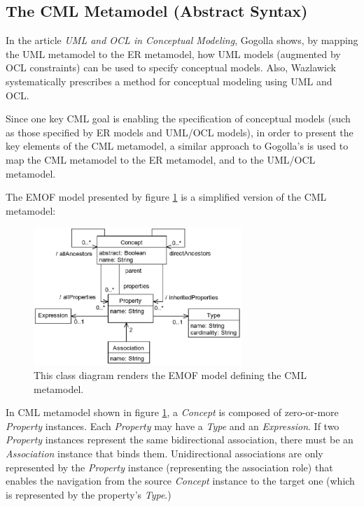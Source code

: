 \subsection{The CML Metamodel (Abstract Syntax)}\label{subsec:metamodel}

In the article \emph{UML and OCL in Conceptual Modeling},
Gogolla \cite{gogolla} shows, by mapping the UML \cite{uml} metamodel to the ER \cite{er} metamodel,
how UML models (augmented by OCL \cite{ocl} constraints) can be used to specify conceptual models.
Also, Wazlawick \cite{wazlawick} systematically prescribes a method for conceptual modeling using UML and OCL.

Since one key CML goal is enabling the specification of conceptual models
(such as those specified by ER models and UML/OCL models),
in order to present the key elements of the CML metamodel,
a similar approach to Gogolla's is used to map the CML metamodel to the ER metamodel,
and to the UML/OCL metamodel.

The EMOF \cite{mof} model presented by figure \ref{fig:metamodel} is a simplified version of the CML metamodel:

\begin{figure}
\centering
\includegraphics[width=0.7\textwidth]{language/diagram-metamodel}
\caption{This class diagram renders the EMOF \cite{mof} model defining the CML metamodel.}
\label{fig:metamodel}
\end{figure}

In CML metamodel shown in figure \ref{fig:metamodel},
a \emph{Concept} is composed of zero-or-more \emph{Property} instances.
Each \emph{Property} may have a \emph{Type} and an \emph{Expression}.
If two \emph{Property} instances represent the same bidirectional association,
there must be an \emph{Association} instance that binds them.
Unidirectional associations are only represented by the \emph{Property} instance (representing the association role)
that enables the navigation from the source \emph{Concept} instance to the target one (which is represented by the property's \emph{Type}.)

